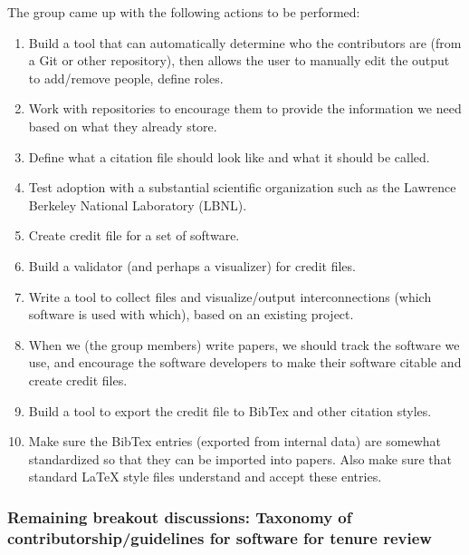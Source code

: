 \documentclass[11pt, oneside]{amsart}
\newcommand{\note}[1]{ {\textcolor{blueish}    { ***Note:      #1 }}}
\begin{document}
The group came up with the following actions to be performed:
\begin{enumerate}
\item Build a tool that can automatically determine who the contributors are
(from a Git or other repository), then allows the user to manually edit the output to
add/remove people, define roles.
\item Work with repositories to encourage them to provide the information we
need based on what they already store.
\item Define what a citation file should look like and what it should be called.
\item Test adoption with a substantial scientific organization such as the Lawrence Berkeley National Laboratory (LBNL).
\item Create credit file for a set of software.
\item Build a validator (and perhaps a visualizer) for credit files.
\item Write a tool to collect files and visualize/output interconnections (which
software is used with which), based on an existing project.
\item When we (the group members) write papers, we should track the software
we use, and encourage the software developers to make their software citable
and create credit files.
\item Build a tool to export the credit file to BibTex and other citation styles.
\item Make sure the BibTex entries (exported from internal data) are somewhat
standardized so that they can be imported into papers.  Also make sure that
standard LaTeX style files understand and accept these entries.
\end{enumerate}


\subsubsection{Remaining breakout discussions: Taxonomy of contributorship/guidelines for software for tenure review}

\end{document}
